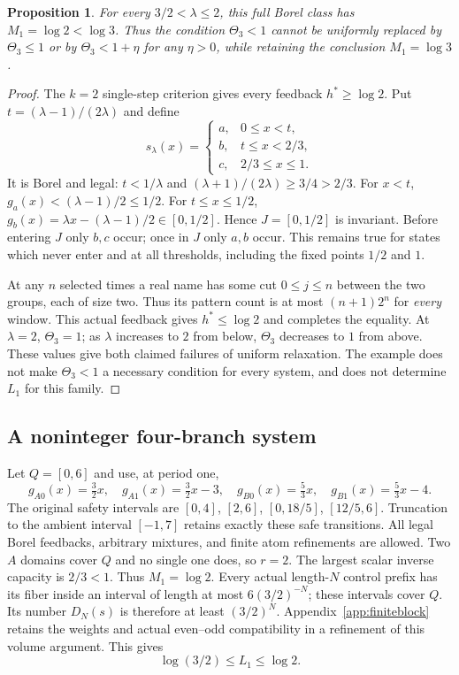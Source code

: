 \documentclass[11pt,reqno]{amsart}
\numberwithin{equation}{section}
\newtheorem{proposition}[theorem]{Proposition}
\theoremstyle{definition}
\begin{document}
\begin{proposition}\label{prop:critical}
For every $3/2<\lambda\le2$, this full Borel class has
$M_1=\log2<\log3$. Thus the condition $\Theta_3<1$ cannot be
uniformly replaced by $\Theta_3\le1$ or by
$\Theta_3<1+\eta$ for any $\eta>0$, while retaining the
conclusion $M_1=\log3$.
\end{proposition}
\begin{proof}
The $k=2$ single-step criterion gives every feedback
$h^*\ge\log2$. Put $t=(\lambda-1)/(2\lambda)$ and define
\[
 s_\lambda(x)=\begin{cases}
 a,&0\le x<t,\\ b,&t\le x<2/3,\\ c,&2/3\le x\le1.
 \end{cases}
\]
It is Borel and legal: $t<1/\lambda$ and
$(\lambda+1)/(2\lambda)\ge3/4>2/3$.
For $x<t$, $g_a(x)<(\lambda-1)/2\le1/2$.
For $t\le x\le1/2$,
$g_b(x)=\lambda x-(\lambda-1)/2\in[0,1/2]$.
Hence $J=[0,1/2]$ is invariant. Before entering $J$ only
$b,c$ occur; once in $J$ only $a,b$ occur. This remains true
for states which never enter and at all thresholds, including the
fixed points $1/2$ and $1$.

At any $n$ selected times a real name has some cut $0\le j\le n$
between the two groups, each of size two. Thus its pattern count
is at most $(n+1)2^n$ for \emph{every} window. This actual
feedback gives $h^*\le\log2$ and completes the equality.
At $\lambda=2$, $\Theta_3=1$; as $\lambda$ increases to $2$
from below, $\Theta_3$ decreases to $1$ from above. These values
give both claimed failures of uniform relaxation. The example
does not make $\Theta_3<1$ a necessary condition for every
system, and does not determine $L_1$ for this family.
\end{proof}

\subsection{A noninteger four-branch system}
\label{subsec:four-affine}
Let $Q=[0,6]$ and use, at period one,
\[
 g_{A0}(x)=\tfrac32x,\quad g_{A1}(x)=\tfrac32x-3,
 \quad g_{B0}(x)=\tfrac53x,\quad g_{B1}(x)=\tfrac53x-4.
\]
The original safety intervals are
$[0,4]$, $[2,6]$, $[0,18/5]$, $[12/5,6]$.
Truncation to the ambient interval $[-1,7]$ retains exactly these
safe transitions. All legal Borel feedbacks, arbitrary mixtures,
and finite atom refinements are allowed. Two $A$ domains cover
$Q$ and no single one does, so $r=2$. The largest scalar
inverse capacity is $2/3<1$. Thus $M_1=\log2$.
Every actual length-$N$ control prefix has its fiber inside an
interval of length at most $6(3/2)^{-N}$; these intervals cover
$Q$. Its number $D_N(s)$ is therefore at least $(3/2)^N$.
Appendix~\ref{app:finiteblock} retains the weights and actual
even--odd compatibility in a refinement of this volume argument.
This gives
\begin{equation}\label{eq:four-L}
 \log(3/2)\le L_1\le\log2.
\end{equation}
\end{document}
